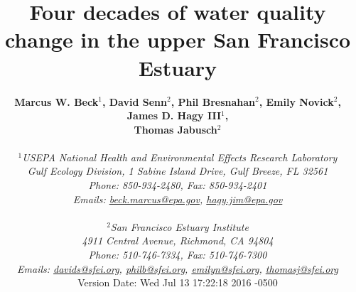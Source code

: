 \documentclass[letterpaper,12pt,oneside]{article}\usepackage[]{graphicx}\usepackage[]{color}
\begin{document}
\raggedbottom
\linenumbers
\raggedright
{}
\setlength{\parindent}{0.5in}
\renewcommand\refname{References \vspace{12pt}}

\begin{singlespace}
\title{{\bf {\Large Four decades of water quality change in the upper San Francisco Estuary}}}
\author{
  {\bf {\normalsize Marcus W. Beck$^1$, David Senn$^2$, Phil Bresnahan$^2$, Emily Novick$^2$, James D. Hagy III$^1$,}}
  \\{\bf {\normalsize Thomas Jabusch$^2$}}
  \\\\{\textit {\normalsize $^1$USEPA National Health and Environmental Effects Research Laboratory}}
  \\{\textit {\normalsize Gulf Ecology Division, 1 Sabine Island Drive, Gulf Breeze, FL 32561}}
	\\{\textit {\normalsize Phone: 850-934-2480, Fax: 850-934-2401}}
	\\{\textit {\normalsize Emails: \href{mailto:beck.marcus@epa.gov}{beck.marcus@epa.gov}, \href{mailto:hagy.jim@epa.gov}{hagy.jim@epa.gov}}}
  \\\\{\textit {\normalsize $^2$San Francisco Estuary Institute}}
	\\{\textit {\normalsize 4911 Central Avenue, Richmond, CA 94804}}
	\\{\textit {\normalsize Phone: 510-746-7334, Fax: 510-746-7300}}
	\\{\textit {\normalsize Emails: \href{mailto:davids@sfei.org}{davids@sfei.org}, \href{mailto:philb@sfei.org}{philb@sfei.org}, \href{mailto:emilyn@sfei.org}{emilyn@sfei.org}, \href{mailto:thomasj@sfei.org}{thomasj@sfei.org}}}
  \vspace{1in} 
  \\ Version Date:   Wed Jul 13 17:22:18 2016 -0500
	}
\date{}
\maketitle
\end{singlespace}
\clearpage
\end{document}
